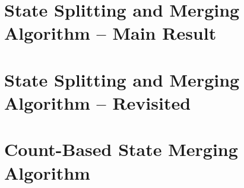 \documentclass{beamer}
\begin{document}
\begin{frame}
	
\end{frame}


\section{State Splitting and Merging Algorithm – Main Result}



\iffalse
\section{State Splitting and Merging Algorithm – Results}

\begin{frame}{\secname}
	
\end{frame}
\fi


\iffalse
\section{Open Questions}

\begin{frame}{\secname}
	\setbeamercovered{transparent}
	\begin{itemize}[<+->]
	\item
		What happens to the corpus’ likelihood while merging?
	\item
		Is the EM training after merging really needed?
	\item
		How do we choose the free parameters ($μ$, $λ$)?
	\item
		Can we avoid merging by cleverly splitting only selected states?
	\end{itemize}
\end{frame}
\fi


\section{State Splitting and Merging Algorithm – Revisited}





\section{Count-Based State Merging Algorithm}
\end{document}
